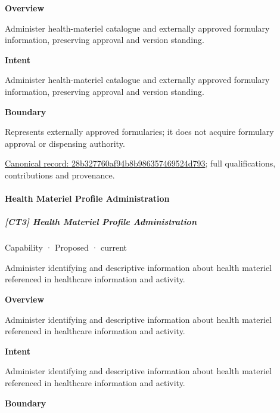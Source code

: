 \textbf{Overview}



Administer health-materiel catalogue and externally approved formulary information, preserving approval and version standing.



\textbf{Intent}



Administer health-materiel catalogue and externally approved formulary information, preserving approval and version standing.



\textbf{Boundary}



Represents externally approved formularies; it does not acquire formulary approval or dispensing authority.


{\footnotesize \href{../../../../continuum/strategy/capability/28b327760af94b8b986357469524d793.md}{Canonical record: 28b327760af94b8b986357469524d793}; full qualifications, contributions and provenance.}\par
\paragraph{Health Materiel Profile Administration}

\subparagraph{[CT3] Health Materiel Profile Administration}

\label{element:9626edae517d40d2bfae619860f18e20}
{\small Capability · Proposed · current}\par

Administer identifying and descriptive information about health materiel referenced in healthcare information and activity.



\textbf{Overview}



Administer identifying and descriptive information about health materiel referenced in healthcare information and activity.



\textbf{Intent}



Administer identifying and descriptive information about health materiel referenced in healthcare information and activity.



\textbf{Boundary}



